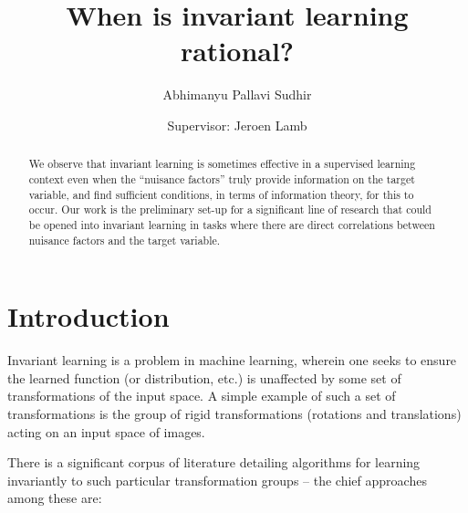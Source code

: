\documentclass[12pt]{article}
\title{When is invariant learning rational?}
\author{Abhimanyu Pallavi Sudhir}
\date{Supervisor: Jeroen Lamb}
\theoremstyle{definition}
\numberwithin{equation}{section}
\numberwithin{figure}{section}
\numberwithin{table}{section}
\begin{document}
\maketitle

\begin{abstract}
    We observe that invariant learning is sometimes effective in a supervised learning context even when the ``nuisance factors'' truly provide information on the target variable, and find sufficient conditions, in terms of information theory, for this to occur. Our work is the preliminary set-up for a significant line of research that could be opened into invariant learning in tasks where there are direct correlations between nuisance factors and the target variable.
\end{abstract}


\tableofcontents

\pagebreak
\section{Introduction}
\label{sec:intro}

Invariant learning is a problem in machine learning, wherein one seeks to ensure the learned function (or distribution, etc.) is unaffected by some set of transformations of the input space. A simple example of such a set of transformations is the group of rigid transformations (rotations and translations) acting on an input space of images. 

There is a significant corpus of literature detailing algorithms for learning invariantly to such particular transformation groups -- the chief approaches among these are: 
\end{document}
